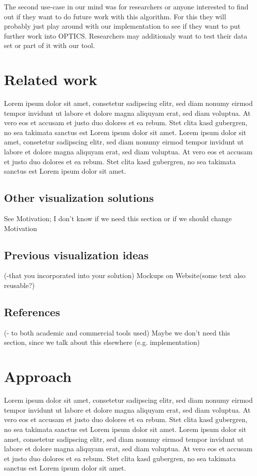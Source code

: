 \documentclass{vgtc}                          %
\begin{document}
\begin{flushleft}
The second use-case in our mind was for researchers or anyone interested to find out if they want to do future work with this algorithm. For this they will probably just play around with our implementation to see if they want to put further work into OPTICS. Researchers may additionaly want to test their data set or part of it with our tool.
\end{flushleft}


\section{Related work}

Lorem ipsum dolor sit amet, consetetur sadipscing elitr, sed diam
nonumy eirmod tempor invidunt ut labore et dolore magna aliquyam erat,
sed diam voluptua. At vero eos et accusam et justo duo dolores et ea
rebum. Stet clita kasd gubergren, no sea takimata sanctus est Lorem
ipsum dolor sit amet. Lorem ipsum dolor sit amet, consetetur
sadipscing elitr, sed diam nonumy eirmod tempor invidunt ut labore et
dolore magna aliquyam erat, sed diam voluptua. At vero eos et accusam
et justo duo dolores et ea rebum. Stet clita kasd gubergren, no sea
takimata sanctus est Lorem ipsum dolor sit amet.

\subsection{Other visualization solutions}
See Motivation; I don't know if we need this section or if we should change Motivation
\subsection{Previous visualization ideas}
(-that you incorporated into your solution)
Mockups on Website(some text also reusable?)
\subsection{References}
(- to both academic and commercial tools used)
Maybe we don't need this section, since we talk about this elsewhere (e.g. implementation)


\section{Approach} %

Lorem ipsum dolor sit amet, consetetur sadipscing elitr, sed diam
nonumy eirmod tempor invidunt ut labore et dolore magna aliquyam erat,
sed diam voluptua. At vero eos et accusam et justo duo dolores et ea
rebum. Stet clita kasd gubergren, no sea takimata sanctus est Lorem
ipsum dolor sit amet. Lorem ipsum dolor sit amet, consetetur
sadipscing elitr, sed diam nonumy eirmod tempor invidunt ut labore et
dolore magna aliquyam erat, sed diam voluptua. At vero eos et accusam
et justo duo dolores et ea rebum. Stet clita kasd gubergren, no sea
takimata sanctus est Lorem ipsum dolor sit amet.
\end{document}
